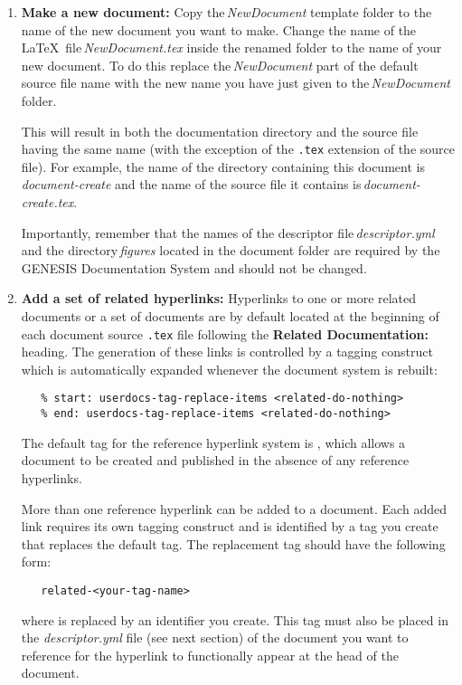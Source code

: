 \documentclass[12pt]{article}
\begin{document}
\begin{enumerate}

\item {\bf Make a new document:} Copy the\,{\it NewDocument} template folder to the name of the new document you want to make. Change the name of the \LaTeX\,\,\,file\,{\it NewDocument.tex} inside the renamed folder to the name of your new document. To do this replace the\,{\it NewDocument} part of the default source file name with the new name you have just given to the\,{\it NewDocument} folder.

This will result in both the documentation directory and the source file having the same name (with the exception of the {\tt .tex} extension of the source file). For example, the name of the directory containing this document is {\it document-create} and the name of the source file it contains is\,{\it document-create.tex}.

Importantly, remember that the names of the descriptor file\,{\it descriptor.yml} and the directory\,{\it figures} located in the document folder are required by the GENESIS Documentation System and should not be changed.

\item {\bf Add a set of related hyperlinks:} Hyperlinks to one or more related documents or a set of documents are by default located at the beginning of each document source {\tt .tex} file following the {\bf Related Documentation:} heading. The generation of these links is controlled by a tagging construct which is automatically expanded whenever the document system is rebuilt:
\begin{verbatim}
   % start: userdocs-tag-replace-items <related-do-nothing>
   % end: userdocs-tag-replace-items <related-do-nothing>
\end{verbatim}
The default tag for the reference hyperlink system is {\tt <related-do-nothing>}, which allows a document to be created and published in the absence of any reference hyperlinks. 

More than one reference hyperlink can be added to a document. Each added link requires its own tagging construct and is identified by a tag you create that replaces the default tag. The replacement tag should have the following form:
\begin{verbatim}
   related-<your-tag-name>
\end{verbatim}
where {\tt <your-tag-name>} is replaced by an identifier you create. This tag must also be placed in the {\it descriptor.yml} file (see next section) of the document you want to reference for the hyperlink to functionally appear at the head of the document.


\end{enumerate}
\end{document}
